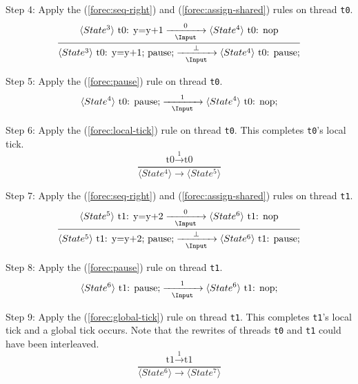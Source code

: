 \noindent
Step 4: Apply the (\ref{forec:seq-right}) and (\ref{forec:assign-shared}) rules
on thread \verb$t0$.
\begin{equation*}
	\frac{
			\langle State^3 \rangle ~ \text{t0: y=y+1}
				\xrightarrow[~~\Input~~]{0} 
			\langle State^4 \rangle ~ \text{t0: nop}
		}{
			\langle State^3 \rangle ~ \text{t0: y=y+1; pause;}
				\xrightarrow[~~\Input~~]{\bot} 
			\langle State^4 \rangle ~ \text{t0: pause;}
		}
\end{equation*}

\noindent
Step 5: Apply the (\ref{forec:pause}) rule on thread \verb$t0$.
\begin{equation*}
	\langle State^4 \rangle ~ \text{t0: pause;}
		\xrightarrow[~~\Input~~]{~~1~~} 
	\langle State^4 \rangle ~ \text{t0: nop;}
\end{equation*}

\noindent
Step 6: Apply the (\ref{forec:local-tick}) rule on thread
\verb$t0$. This completes \verb$t0$'s local tick. 
\begin{equation*}
	\frac{
			\text{t0} \xrightarrow{~~1~~} \text{t0}
		}{
			\langle State^4 \rangle \xrightarrow{~~~~~} \langle State^5 \rangle
		}
\end{equation*}

\noindent
Step 7: Apply the (\ref{forec:seq-right}) and (\ref{forec:assign-shared}) rules
on thread \verb$t1$.
\begin{equation*}
	\frac{
			\langle State^5 \rangle ~ \text{t1: y=y+2}
				\xrightarrow[~~\Input~~]{0} 
			\langle State^6 \rangle ~ \text{t1: nop}
		}{
			\langle State^5 \rangle ~ \text{t1: y=y+2; pause;}
				\xrightarrow[~~\Input~~]{\bot} 
			\langle State^6 \rangle ~ \text{t1: pause;}
		}
\end{equation*}

\noindent
Step 8: Apply the (\ref{forec:pause}) rule on thread \verb$t1$.
\begin{equation*}
	\langle State^6 \rangle ~ \text{t1: pause;}
		\xrightarrow[~~\Input~~]{~~1~~} 
	\langle State^6 \rangle ~ \text{t1: nop;}
\end{equation*}

\noindent
Step 9: Apply the (\ref{forec:global-tick}) rule on thread
\verb$t1$. This completes \verb$t1$'s local tick and a 
global tick occurs. Note that the rewrites of threads \verb$t0$ and 
\verb$t1$ could have been interleaved.
\begin{equation*}
	\frac{
			\text{t1} \xrightarrow{~~1~~} \text{t1}
		}{
			\langle State^6 \rangle \xrightarrow{~~~~~} \langle State^7 \rangle
		}
\end{equation*}

